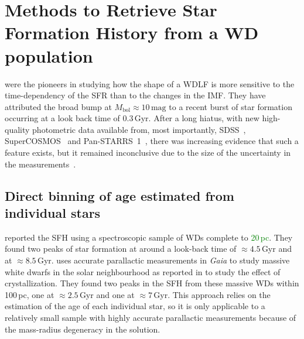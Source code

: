 \documentclass[fleqn,usenatbib]{mnras}
\begin{document}
\section{Methods to Retrieve Star Formation History from a WD population}
\citet{1990ApJ...352..605N} were the pioneers in studying how the shape of
a WDLF is more sensitive to the time-dependency of the SFR than to the changes
in the IMF. They have attributed the broad bump at
$M_{\mathrm{bol}} \approx 10\,\mathrm{mag}$ to a recent burst of star formation
occurring at a look back time of 0.3\,Gyr. After a long hiatus, with new
high-quality photometric data available from, most importantly, 
SDSS~\citep{2000AJ....120.1579Y}, SuperCOSMOS~\citep{2001MNRAS.326.1279H} and
Pan-STARRS~1~\citep{2016arXiv161205560C}, there was increasing evidence that
such a feature exists, but it remained inconclusive due to the size of the
uncertainty in the  measurements~\citep{2006AJ....131..571H,
2011MNRAS.417...93R, 2019MNRAS.482..715L, 2024MNRAS.535.3611Q}.

\subsection{Direct binning of age estimated from individual stars}
\citet[][hereafter, T14]{2014ApJ...791...92T} reported the SFH using a
spectroscopic sample of WDs complete to \textcolor{green}{20\,pc}. They found two peaks of star
formation at around a look-back time of $\approx4.5$\,Gyr and at 
$\approx8.5$\,Gyr. \citet{2019ApJ...878L..11I} uses accurate parallactic 
measurements in \textit{Gaia} to study massive white dwarfs in the solar
neighbourhood as reported in \citet{2019Natur.565..202T} to study the effect of
crystallization. They found two peaks in the SFH from these massive WDs within
100\,pc, one at $\approx2.5$\,Gyr and one at
$\approx7$\,Gyr. This approach relies on the estimation of the age of each
individual star, so it is only applicable to a relatively small sample with
highly accurate parallactic measurements because of the mass-radius degeneracy
in the solution.

\end{document}

